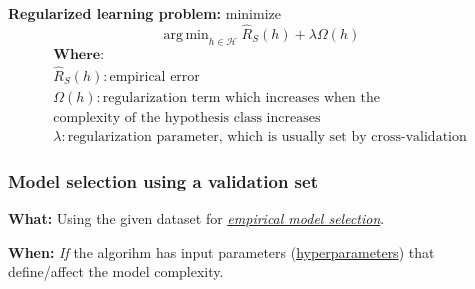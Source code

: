 \documentclass[12pt, a4paper]{article}
\DeclareMathOperator*{\argmin}{arg\,min} %
\begin{document}
\textbf{Regularized learning problem:} minimize
$$
\argmin_{h \in \mathcal{H}} \hat{R}_S(h) + \lambda \Omega(h)
$$
\begin{gather*}
  \textbf{Where:} \\
  \textbf{$\hat{R}_S(h)$}: \text{empirical error} \\
  \textbf{$\Omega(h)$}: \text{regularization term which increases when the} \\ \text{complexity of the hypothesis class increases} \\
  \textbf{$\lambda$}: \text{regularization parameter, which is usually set by cross-validation}
\end{gather*}









\subsubsection{Model selection using a validation set}\label{validation-set}

\textbf{What:} Using the given dataset for \uline{\textit{empirical model selection}}.

\textbf{When:} \textit{If} the algorihm has input parameters (\uline{hyperparameters}) that define/affect the model complexity.
\end{document}
